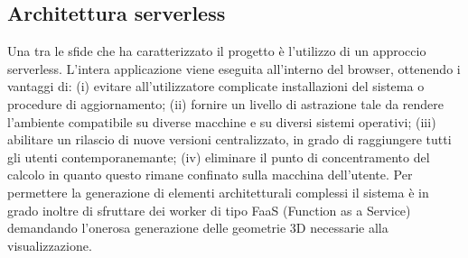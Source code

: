 \subsection{Architettura serverless}
Una tra le sfide che ha caratterizzato il progetto \`e l'utilizzo di un approccio serverless. L'intera applicazione viene eseguita all'interno del browser, ottenendo i vantaggi di: (i) evitare all'utilizzatore complicate installazioni del sistema o procedure di aggiornamento; (ii) fornire un livello di astrazione tale da rendere l'ambiente compatibile su diverse macchine e su diversi sistemi operativi; (iii) abilitare un rilascio di nuove versioni centralizzato, in grado di raggiungere tutti gli utenti contemporanemante; (iv) eliminare il punto di concentramento del calcolo in quanto questo rimane confinato sulla macchina dell'utente.
Per permettere la generazione di elementi architetturali complessi il sistema \`e in grado inoltre di sfruttare dei worker di tipo FaaS (Function as a Service) demandando l'onerosa generazione delle geometrie 3D necessarie alla visualizzazione.
